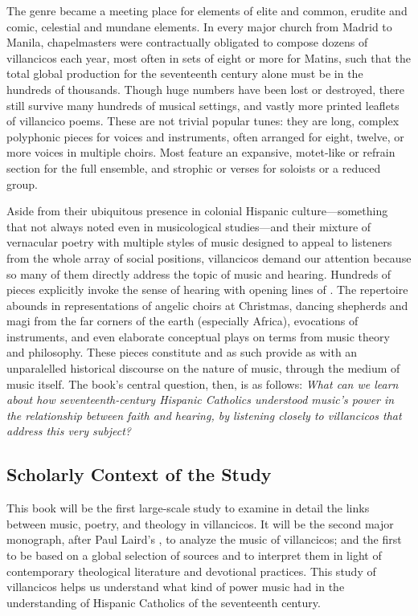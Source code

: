 \documentclass[tt]{vcbook-proposal}
\begin{document}
The genre became a meeting place for elements of elite and common, erudite and comic, celestial and mundane elements.
In every major church from Madrid to Manila, chapelmasters were contractually obligated to compose dozens of villancicos each year, most often in sets of eight or more for Matins, such that the total global production for the seventeenth century alone must be in the hundreds of thousands.
Though huge numbers have been lost or destroyed, there still survive many hundreds of musical settings, and vastly more printed leaflets of villancico poems. 
These are not trivial popular tunes: they are long, complex polyphonic pieces for voices and instruments, often arranged for eight, twelve, or more voices in multiple choirs.
Most feature an expansive, motet-like  or refrain section for the full ensemble, and strophic  or verses for soloists or a reduced group.

Aside from their ubiquitous presence in colonial Hispanic culture---something that not always noted even in musicological studies---and their mixture of vernacular poetry with multiple styles of music designed to appeal to listeners from the whole array of social positions, villancicos demand our attention because so many of them directly address the topic of music and hearing.
Hundreds of pieces explicitly invoke the sense of hearing with opening lines of   .
The repertoire abounds in representations of angelic choirs at Christmas, dancing shepherds and magi from the far corners of the earth (especially Africa), evocations of instruments, and even elaborate conceptual plays on terms from music theory and philosophy.
These pieces constitute  and as such provide as with an unparalelled historical discourse on the nature of music, through the medium of music itself.
The book's central question, then, is as follows: 
\emph{What can we learn about how seventeenth-century Hispanic Catholics understood music's power in the relationship between faith and hearing, by listening closely to villancicos that address this very subject?}

\subsection{Scholarly Context of the Study}

This book will be the first large-scale study to examine in detail the links between music, poetry, and theology in villancicos.
It will be the second major monograph, after Paul Laird's , to analyze the music of villancicos; and the first to be based on a global selection of sources and to interpret them in light of contemporary theological literature and devotional practices.
This study of villancicos helps us understand what kind of power music had in the understanding of Hispanic Catholics of the seventeenth century.
\end{document}
